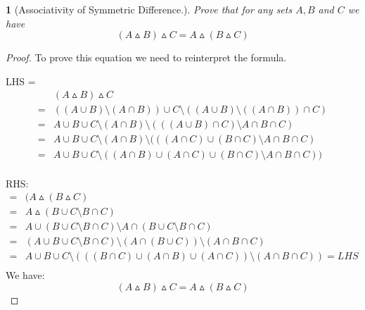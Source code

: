 \documentclass{book}
\newtheorem{minorEx}{}[section]
\begin{document}
    \begin{minorEx} %
    [Associativity of Symmetric Difference.] Prove that for any sets $A, B$ and $C$ we have $$(A \vartriangle B) \vartriangle C = A \vartriangle (B \vartriangle C)$$
    \end{minorEx}
    \begin{proof}
    To prove this equation we need to reinterpret the formula.
    
    LHS = 
    \begin{align*}
     & (A \vartriangle B) \vartriangle C \\
    =& ((A \cup B) \setminus (A \cap B)) \cup C \setminus ((A \cup B) \setminus ((A \cap B)) \cap C) \\
    =& A \cup B \cup C \setminus (A \cap B) \setminus (((A \cup B) \cap C) \setminus A \cap B \cap C) \\
    =& A \cup B \cup C \setminus (A \cap B) \setminus (((A \cap C) \cup (B \cap C) \setminus A \cap B \cap C)\\
    =& A \cup B \cup C \setminus ((A \cap B) \cup (A \cap C) \cup (B \cap C) \setminus A \cap B \cap C))\\
    \end{align*}
    
    RHS:
    \begin{align*}
    =& (A \vartriangle (B \vartriangle C)\\
    =& A \vartriangle (B \cup C \setminus B \cap C)\\
    =& A \cup (B \cup C \setminus B \cap C) \setminus A \cap (B \cup C \setminus B \cap C)\\
    =& (A \cup B \cup C \setminus B \cap C) \setminus (A \cap (B \cup C)) \setminus (A \cap B \cap C)\\
    =& A \cup B \cup C \setminus (((B \cap C) \cup (A \cap B) \cup (A \cap C)) \setminus (A \cap B \cap C)) = LHS\\
    \end{align*}
    We have: $$(A \vartriangle B) \vartriangle C = A \vartriangle (B \vartriangle C)$$
    \end{proof}
    
\end{document}
